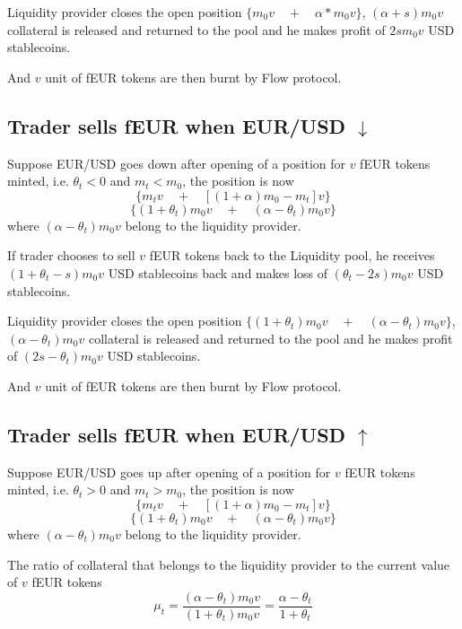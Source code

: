 \documentclass{article}
\begin{document}
Liquidity provider closes the open position $\{ m_0v \quad  +  \quad \alpha*m_0v \}$,  $(\alpha +s)m_0 v$ collateral is released and returned to the pool and he makes profit of $2s m_0 v$ USD stablecoins. \par

And $v$ unit of fEUR tokens are then burnt by Flow protocol.

\subsection{Trader sells fEUR when EUR/USD $\downarrow$}
Suppose EUR/USD goes down after opening of a position for $v$ fEUR tokens minted, i.e. $\theta_t<0$ and $m_t<m_0$, the position is now
$$\{ m_t v   \quad +  \quad  [(1+\alpha)m_0-m_t]v \}$$
$$\{ (1+\theta_t)m_0 v   \quad +  \quad  (\alpha-\theta_t)m_0 v \}$$
where $(\alpha-\theta_t)m_0 v$ belong to the liquidity provider. \par

If trader chooses to sell $v$ fEUR tokens back to the Liquidity pool, he receives $(1+\theta_t -s)m_0 v$ USD stablecoins back and makes loss of  $(\theta_t -2s)m_0 v$ USD stablecoins.\par

Liquidity provider closes the open position $\{ (1+\theta_t)m_0 v   \quad +  \quad  (\alpha-\theta_t)m_0 v \}$, \\ $(\alpha-\theta_t)m_0 v$ collateral is released and returned to the pool and he makes profit of $(2s - \theta_t)m_0 v$ USD stablecoins. \par

And $v$ unit of fEUR tokens are then burnt by Flow protocol.

\subsection{Trader sells fEUR when EUR/USD $\uparrow$}
Suppose EUR/USD goes up after opening of a position for $v$ fEUR tokens minted, i.e. $\theta_t>0$ and $m_t>m_0$, the position is now
$$\{ m_t v   \quad +  \quad  [(1+\alpha)m_0-m_t]v \}$$
$$\{ (1+\theta_t)m_0 v   \quad +  \quad  (\alpha-\theta_t)m_0 v \}$$
where $(\alpha-\theta_t)m_0 v$ belong to the liquidity provider. \par

The ratio of collateral that belongs to the liquidity provider to the current value of $v$ fEUR tokens
$$ \mu_t=\frac{(\alpha-\theta_t)m_0 v}{(1+\theta_t)m_0 v}=\frac{\alpha - \theta_t}{1+\theta_t}$$\par
\end{document}

